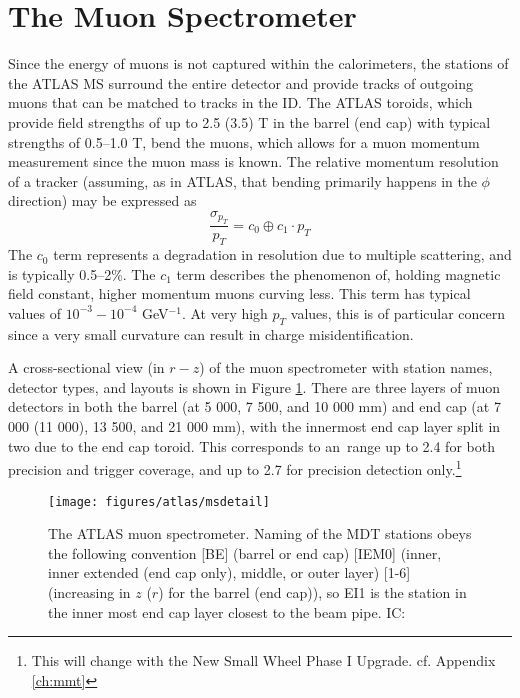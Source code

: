 \section{The Muon Spectrometer}
Since the energy of muons is not captured within the calorimeters, the stations of the ATLAS MS surround the entire detector and provide tracks of outgoing muons that can be matched to tracks in the ID.  The ATLAS toroids, which provide field strengths of up to 2.5 (3.5) T in the barrel (end cap) with typical strengths of 0.5--1.0 T, bend the muons, which allows for a muon momentum measurement since the muon mass is known.  The relative momentum resolution of a tracker (assuming, as in ATLAS, that bending primarily happens in the $\phi$ direction) may be expressed as
\begin{equation}
\frac{\sigma_{p_T}}{p_T}=c_0\oplus c_1\cdot p_T
\label{eqn:ptres}
\end{equation}
The $c_0$ term represents a degradation in resolution due to multiple scattering, and is typically 0.5--2\%\cite{tully}.  The $c_1$ term describes the phenomenon of, holding magnetic field constant, higher momentum muons curving less.  This term has typical values of $10^{-3}-10^{-4}$ GeV$^{-1}$.  At very high $p_T$ values, this is of particular concern since a very small curvature can result in charge misidentification.

A cross-sectional view (in $r-z$) of the muon spectrometer with station names, detector types, and layouts is shown in Figure \ref{fig:ms}.  There are three layers of muon detectors in both the barrel (at 5 000, 7 500, and 10 000 mm) and end cap (at 7 000 (11 000), 13 500, and 21 000 mm), with the innermost end cap layer split in two due to the end cap toroid.  This corresponds to an \aeta\,range up to 2.4 for both precision and trigger coverage, and up to 2.7 for precision detection only.\footnote{This will change with the New Small Wheel Phase I Upgrade.  cf. Appendix \ref{ch:mmt}}
\begin{figure}[!htbp]\captionsetup{justification=centering}
  \centering
  \texttt{[image: figures/atlas/msdetail]}
  \caption{The ATLAS muon spectrometer.  Naming of the MDT stations obeys the following convention [BE] (barrel or end cap) [IEM0] (inner, inner extended (end cap only), middle, or outer layer) [1-6] (increasing in $z$ ($r$) for the barrel (end cap)), so EI1 is the station in the inner most end cap layer closest to the beam pipe.  IC: \cite{jinstpaper}}
  \label{fig:ms}
\end{figure}

